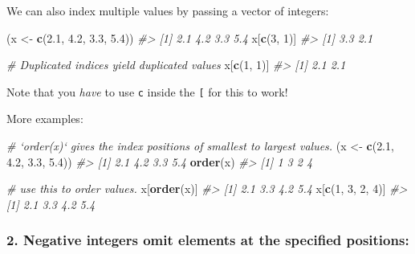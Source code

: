 \documentclass[]{book}
\newenvironment{Shaded}{\begin{snugshade}}{\end{snugshade}}
\newcommand{\CommentTok}[1]{\textcolor[rgb]{0.56,0.35,0.01}{\textit{#1}}}
\newcommand{\DecValTok}[1]{\textcolor[rgb]{0.00,0.00,0.81}{#1}}
\newcommand{\FloatTok}[1]{\textcolor[rgb]{0.00,0.00,0.81}{#1}}
\newcommand{\KeywordTok}[1]{\textcolor[rgb]{0.13,0.29,0.53}{\textbf{#1}}}
\newcommand{\NormalTok}[1]{#1}
\newcommand{\StringTok}[1]{\textcolor[rgb]{0.31,0.60,0.02}{#1}}
\begin{document}
We can also index multiple values by passing a vector of integers:

\begin{Shaded}
\begin{Highlighting}[]
\NormalTok{(x <-}\StringTok{ }\KeywordTok{c}\NormalTok{(}\FloatTok{2.1}\NormalTok{, }\FloatTok{4.2}\NormalTok{, }\FloatTok{3.3}\NormalTok{, }\FloatTok{5.4}\NormalTok{))}
\CommentTok{#> [1] 2.1 4.2 3.3 5.4}
\NormalTok{x[}\KeywordTok{c}\NormalTok{(}\DecValTok{3}\NormalTok{, }\DecValTok{1}\NormalTok{)]}
\CommentTok{#> [1] 3.3 2.1}

\CommentTok{# Duplicated indices yield duplicated values}
\NormalTok{x[}\KeywordTok{c}\NormalTok{(}\DecValTok{1}\NormalTok{, }\DecValTok{1}\NormalTok{)]}
\CommentTok{#> [1] 2.1 2.1}
\end{Highlighting}
\end{Shaded}

Note that you \emph{have} to use \texttt{c} inside the \texttt{{[}} for this to work!

More examples:

\begin{Shaded}
\begin{Highlighting}[]
\CommentTok{# `order(x)` gives the index positions of smallest to largest values.}
\NormalTok{(x <-}\StringTok{ }\KeywordTok{c}\NormalTok{(}\FloatTok{2.1}\NormalTok{, }\FloatTok{4.2}\NormalTok{, }\FloatTok{3.3}\NormalTok{, }\FloatTok{5.4}\NormalTok{))}
\CommentTok{#> [1] 2.1 4.2 3.3 5.4}
\KeywordTok{order}\NormalTok{(x)}
\CommentTok{#> [1] 1 3 2 4}

\CommentTok{# use this to order values.}
\NormalTok{x[}\KeywordTok{order}\NormalTok{(x)]}
\CommentTok{#> [1] 2.1 3.3 4.2 5.4}
\NormalTok{x[}\KeywordTok{c}\NormalTok{(}\DecValTok{1}\NormalTok{, }\DecValTok{3}\NormalTok{, }\DecValTok{2}\NormalTok{, }\DecValTok{4}\NormalTok{)]}
\CommentTok{#> [1] 2.1 3.3 4.2 5.4}
\end{Highlighting}
\end{Shaded}

\hypertarget{negative-integers-omit-elements-at-the-specified-positions}{%
\subsubsection*{\texorpdfstring{2. \textbf{Negative integers} omit elements at the specified positions:}{2. Negative integers omit elements at the specified positions:}}\label{negative-integers-omit-elements-at-the-specified-positions}}
\end{document}
